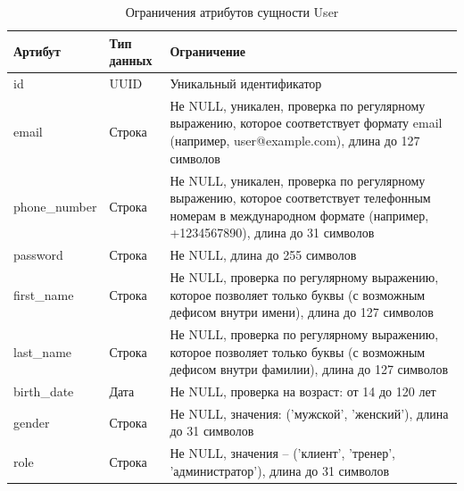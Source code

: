 \begin{table}[H]
	\centering
	\begin{tabular}{|p{3.5cm}|p{3.5cm}|p{8.5cm}|}
		\hline
		\textbf{Артибут}             & \textbf{Тип данных}   & \textbf{Ограничение}             \\ \hline
		id                            & UUID                  & Уникальный идентификатор         \\ \hline
		email                         & Строка                 & Не NULL, уникален, проверка по регулярному выражению, которое соответствует формату email (например, user@example.com), длина до 127 символов \\ \hline
		phone\_number                 & Строка                 & Не NULL, уникален, проверка по регулярному выражению, которое соответствует телефонным номерам в международном формате (например, +1234567890), длина до 31 символов \\ \hline
		password                      & Строка                 & Не NULL, длина до 255 символов                        \\ \hline
		first\_name                   & Строка                 & Не NULL, проверка по регулярному выражению, которое позволяет только буквы (с возможным дефисом внутри имени), длина до 127 символов \\ \hline
		last\_name                    & Строка                 & Не NULL, проверка по регулярному выражению, которое позволяет только буквы (с возможным дефисом внутри фамилии), длина до 127 символов \\ \hline
		birth\_date                   & Дата                   & Не NULL, проверка на возраст: от 14 до 120 лет \\ \hline
		gender                        & Строка                 & Не NULL, значения: ('мужской', 'женский'), длина до 31 символов \\ \hline
			role                          & Строка                  & Не NULL, значения -- ('клиент', 'тренер', 'администратор'), длина до 31 символов \\ \hline
	\end{tabular}
	\caption{Ограничения атрибутов сущности User}
\end{table}

